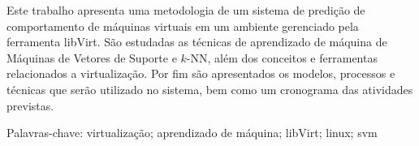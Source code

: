 \documentclass[font=plain,chapter=TITLE,section=Title,espaco=duplo,tocpage=plain,appendix=Name,floatnumber=continuous]{abnt}
\begin{document}


\UTPCapa
\UTPFalsaFolhaDeRosto
\UTPFolhaDeRosto

\begin{resumo}
Este trabalho apresenta uma metodologia de um sistema de predição de
comportamento de máquinas virtuais em um ambiente gerenciado pela
ferramenta libVirt. São estudadas as técnicas de aprendizado de máquina de
Máquinas de Vetores de Suporte e $k$-NN, além dos conceitos e ferramentas
relacionados a virtualização. Por fim são apresentados os modelos,
processos e técnicas que serão utilizado no sistema, bem como um cronograma
das atividades previstas.

Palavras-chave: virtualização; aprendizado de máquina; libVirt; linux; svm
\end{resumo}

\listoffigures
\listadequadros
\sumario
















\end{document}
